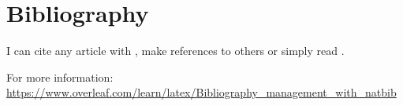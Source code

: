 \section{Bibliography}

I can cite any article with \citet{thekey}, make references to others \citep{Lander2016} 
or simply read \cite{HP3}.

%

For more information: 
\url{https://www.overleaf.com/learn/latex/Bibliography_management_with_natbib}

